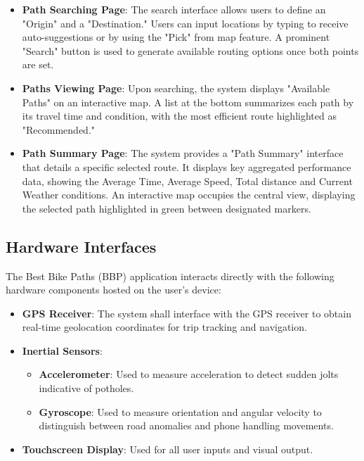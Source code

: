 \begin{itemize}
    \item \textbf{Path Searching Page}: The search interface allows users to define an "Origin" and a "Destination." Users can input locations by typing to receive auto-suggestions or by using the "Pick" from map feature. A prominent "Search" button is used to generate available routing options once both points are set.

    \item \textbf{Paths Viewing Page}: Upon searching, the system displays "Available Paths" on an interactive map. A list at the bottom summarizes each path by its travel time and condition, with the most efficient route highlighted as "Recommended."

    \item \textbf{Path Summary Page}: The system provides a "Path Summary" interface that details a specific selected route. It displays key aggregated performance data, showing the Average Time, Average Speed, Total distance and Current Weather conditions. An interactive map occupies the central view, displaying the selected path highlighted in green between designated markers.

\end{itemize}

\subsection{Hardware Interfaces}

The Best Bike Paths (BBP) application interacts directly with the following hardware components hosted on the user's device:

\begin{itemize}
    \item \textbf{GPS Receiver}: The system shall interface with the GPS receiver to obtain real-time geolocation coordinates for trip tracking and navigation.

    \item \textbf{Inertial Sensors}:
    \begin{itemize}
        \item \textbf{Accelerometer}: Used to measure acceleration to detect sudden jolts indicative of potholes.
        \item \textbf{Gyroscope}: Used to measure orientation and angular velocity to distinguish between road anomalies and phone handling movements.
    \end{itemize}

    \item \textbf{Touchscreen Display}: Used for all user inputs and visual output.
\end{itemize}

